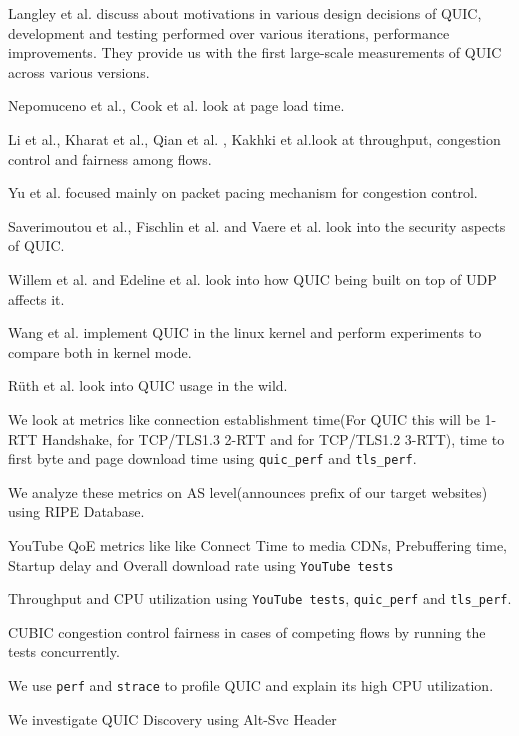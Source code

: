 \begin{frame}
    Langley et al. \cite{DBLP:conf/sigcomm/LangleyRWVKZYKS17} discuss about motivations in various design decisions of QUIC, development and testing performed over various iterations, performance improvements. They provide us with the first large-scale measurements of QUIC across various versions.
    
    Nepomuceno et al.\cite{8538687}, Cook et al.\cite{DBLP:conf/icc/CookMTH17} look at page load time.
    
    Li et al.\cite{DBLP:conf/pam/LiCJC18}, Kharat et al.\cite{8524247}, Qian et al. \cite{DBLP:journals/access/QianWT18}, Kakhki et al.\cite{DBLP:conf/imc/KakhkiJCNM17}look at throughput, congestion control and fairness among flows.
    
    Yu et al. \cite{DBLP:conf/ipccc/YuXY17} focused mainly on packet pacing mechanism for congestion control.
    
    Saverimoutou et al.\cite{DBLP:conf/iscc/SaverimoutouMV17}, Fischlin et al.\cite{DBLP:conf/ccs/FischlinG14} and Vaere et al.\cite{DBLP:conf/imc/VaereBKT18} look into the security aspects of QUIC.
    
    Willem et al.\cite{udpgso} and Edeline et al. \cite{DBLP:journals/corr/EdelineKTAD16} look into how QUIC being built on top of UDP affects it.
    
    Wang et al.\cite{DBLP:conf/mswim/WangBRP18} implement QUIC in the linux kernel and perform experiments to compare both in kernel mode.

    Rüth et al.\cite{DBLP:conf/pam/RuthPDH18} look into QUIC usage in the wild.

     
\end{frame}
\clearpage

\begin{frame}
We look at metrics like connection establishment time(For QUIC this will be 1-RTT Handshake, for TCP/TLS1.3 2-RTT and for TCP/TLS1.2 3-RTT), time to first byte and page download time using \texttt{quic\_perf} and \texttt{tls\_perf}.

We analyze these metrics on AS level(announces prefix of our target websites) using RIPE Database.\cite{RIPEDB} 

YouTube QoE metrics like like Connect Time to media CDNs, Prebuffering time, Startup delay and Overall download rate using \texttt{YouTube tests}

Throughput and  CPU utilization using \texttt{YouTube tests}, \texttt{quic\_perf} and \texttt{tls\_perf}.

CUBIC congestion control fairness in cases of competing flows by running the tests concurrently.

We use \texttt{perf} and \texttt{strace} to profile QUIC and explain its high CPU utilization.

We investigate QUIC Discovery using Alt-Svc Header
 
\end{frame}
\clearpage

